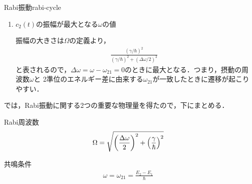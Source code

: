 \documentclass{report}
\begin{document}
\begin{myex}{Rabi振動}{rabi-cycle}
\begin{enumerate}
        \begin{align}
          c_1(t) = \frac{\hbar}{\gamma}\exp\qty(-\i\frac{\Delta\omega}{2}t)\qty[\frac{\Delta\omega}{2}\qty(A\e^{\i\Omega t} + B\e^{-\i\Omega t}) - \Omega\qty(A\e^{\i\Omega t} - B\e^{-\i\Omega t})]
        \end{align}
        となる．
        初期条件を考えると，
        \begin{align}
          \begin{dcases}
            A + B = 0 \\ 
            A - B = -\frac{\gamma}{\hbar\Omega}
          \end{dcases}
        \end{align}
        であるから，
        \begin{align}
          B = -A = \frac{\gamma}{2\hbar\Omega}
        \end{align}
        となる．よって，
        \begin{align}
          c_1(t) &= \exp\qty(-\i\frac{\Delta\omega}{2}t)\qty(\cos\Omega t - \i\frac{\Delta \omega}{2\Omega}\sin\Omega t) \\ 
          c_2(t) &=  - \i\frac{\gamma}{\hbar\Omega}\exp\qty(-\i\frac{\Delta\omega}{2}t)\sin\Omega t
        \end{align}
        である．時刻$t$で$\ket{1}$，$\ket{2}$に状態を見出す確率，$\abs{c_1(t)}^2$，$\abs{c_2(t)}^2$はそれぞれ，
        \begin{align}
          \abs{c_1(t)}^2 &= \cos^2\Omega t + \qty(\frac{\Delta \omega}{2})^2\frac{1}{\Omega^2}\sin^2\Omega t \\ 
          \abs{c_2(t)}^2 &= \frac{\gamma^2}{\hbar^2\Omega^2}\sin^2\Omega t
        \end{align}
        である．簡単な計算により，$\abs{c_1(t)}^2 + \abs{c_2(t)}^2 = 1$となることが容易に確かめられる．
      \item $c_2(t)$の振幅が最大となる$\omega$の値\par
        振幅の大きさは$\Omega$の定義より，
        \begin{align}
          \frac{(\gamma/\hbar)^2}{(\gamma/\hbar)^2 + (\Delta\omega/2)^2}
        \end{align}
        と表されるので，$\Delta\omega = \omega - \omega_{21} = 0$のときに最大となる．つまり，摂動の周波数$\omega$と
        2準位のエネルギー差に由来する$\omega_{21}$が一致したときに遷移が起こりやすい．
    \end{enumerate}
  \end{myex}
  では，Rabi振動に関する2つの重要な物理量を得たので，下にまとめる．
  \begin{itembox}[l]{Rabi周波数}
    \begin{align}
    \Omega = \sqrt{\qty(\frac{\Delta\omega}{2})^2 + \qty(\frac{\gamma}{\hbar})^2}
    \end{align}
  \end{itembox}
  \begin{itembox}[l]{共鳴条件}
    \begin{align}
      \omega = \omega_{21} = \frac{E_2 - E_1}{\hbar}
    \end{align}
  \end{itembox}
\end{document}
